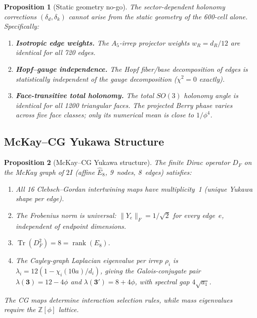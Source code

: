 \documentclass[12pt,a4paper]{article}
\newtheorem{proposition}{Proposition}
\theoremstyle{definition}
\begin{document}
\begin{proposition}[Static geometry no-go]\label{prop:S-nogo}
The sector-dependent holonomy corrections $(\delta_d, \delta_k)$ cannot arise from
the static geometry of the 600-cell alone. Specifically:
\begin{enumerate}
\item[(i)] \textbf{Isotropic edge weights.} The $A_5$-irrep projector weights
  $w_R = d_R/12$ are identical for all 720 edges.
\item[(ii)] \textbf{Hopf--gauge independence.} The Hopf fiber/base decomposition
  of edges is statistically independent of the gauge decomposition ($\chi^2 = 0$ exactly).
\item[(iii)] \textbf{Face-transitive total holonomy.} The total $SO(3)$ holonomy angle is identical
  for all 1200 triangular faces. The projected Berry phase varies across five face classes; only its numerical mean is close to $1/\phi^4$.
\end{enumerate}
\end{proposition}

\subsection{McKay--CG Yukawa Structure}

\begin{proposition}[McKay--CG Yukawa structure]\label{prop:S-mckay-df}
The finite Dirac operator $D_F$ on the McKay graph of $2I$ (affine $\hat{E}_8$,
9~nodes, 8~edges) satisfies:
\begin{enumerate}
\item[(i)] All 16 Clebsch--Gordan intertwining maps have multiplicity~1
  (unique Yukawa shape per edge).
\item[(ii)] The Frobenius norm is \emph{universal}: $\|Y_e\|_F = 1/\sqrt{2}$
  for every edge~$e$, independent of endpoint dimensions.
\item[(iii)] $\operatorname{Tr}(D_F^2) = 8 = \operatorname{rank}(E_8)$.
\item[(iv)] The Cayley-graph Laplacian eigenvalue per irrep $\rho_i$ is
  $\lambda_i = 12(1 - \chi_i(10a)/d_i)$, giving the Galois-conjugate pair
  $\lambda(\mathbf{3}) = 12 - 4\phi$ and
  $\lambda(\mathbf{3'}) = 8 + 4\phi$,
  with spectral gap $4\sqrt{a_1}$.
\end{enumerate}
The CG maps determine interaction \emph{selection rules},
while mass \emph{eigenvalues} require the $\mathbb{Z}[\phi]$ lattice.
\end{proposition}
\end{document}
